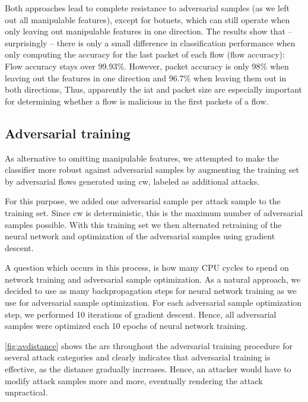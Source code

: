 \documentclass[conference]{IEEEtran}
\begin{document}
Both approaches lead to complete resistance to adversarial samples (as we left out all manipulable features), except for botnets, which can still operate when only leaving out manipulable features in one direction. The results show that -- surprisingly -- there is only a small difference in classification performance when only computing the accuracy for the last packet of each flow (flow accuracy): Flow accuracy stays over 99.93\%. However, packet accuracy is only 98\% when leaving out the features in one direction and 96.7\% when leaving them out in both directions, Thus, apparently the \gls{iat} and packet size are especially important for determining whether a flow is malicious in the first packets of a flow.

\subsection{Adversarial training}
As alternative to omitting manipulable features, we attempted to make the classifier more robust against adversarial samples by augmenting the training set by adversarial flows generated using  \gls{cw}, labeled as additional attacks.

For this purpose, we added one adversarial sample per attack sample to the training set. Since \gls{cw} is deterministic, this is the maximum number of adversarial samples possible. With this training set we then alternated retraining of the neural network and optimization of the adversarial samples using gradient descent.

A question which occurs in this process, is how many CPU cycles to spend on network training and adversarial sample optimization. As a natural approach, we decided to use as many backpropagation steps for neural network training as we use for adversarial sample optimization.  For each adversarial sample optimization step, we performed 10 iterations of gradient descent. Hence, all adversarial samples were optimized each 10 epochs of neural network training.

\autoref{fig:avdistance} shows the \gls{ars} throughout the adversarial training procedure for several attack categories and clearly indicates that adversarial training is effective, as the distance gradually increases. Hence, an attacker would have to modify attack samples more and more, eventually rendering the attack unpractical.

\end{document}
